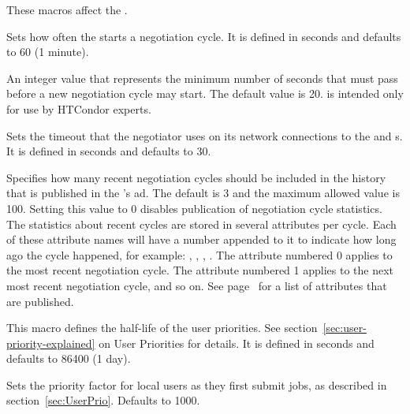 These macros affect the .
\begin{description}
  
\label{param:NegotiatorInterval}
\item[\Macro{NEGOTIATOR\_INTERVAL}]
  Sets how often the  starts a negotiation cycle.
  It is defined in seconds and defaults to 60 (1 minute).
  
\label{param:NegotiatorCycleDelay}
\item[\Macro{NEGOTIATOR\_CYCLE\_DELAY}]
  An integer value that represents the minimum number of seconds
  that must pass before a new negotiation cycle may start.
  The default value is 20.
   is intended only for use by
  HTCondor experts.

\label{param:NegotiatorTimeout}
\item[\Macro{NEGOTIATOR\_TIMEOUT}]
  Sets the timeout that the negotiator uses on its network connections
  to the  and s.
  It is defined in seconds and defaults to 30.

\label{param:NegotiationCycleStatsLength}
\item[\Macro{NEGOTIATION\_CYCLE\_STATS\_LENGTH}] Specifies how many
  recent negotiation cycles should be included in the history that is
  published in the 's ad.  The default is 3 and the
  maximum allowed value is 100.  Setting this value to 0 disables
  publication of negotiation cycle statistics.  The
  statistics about recent cycles are stored in several attributes per
  cycle.  Each of these attribute names will have a number appended to
  it to indicate how long ago the cycle happened, for example:
  ,
  ,
  , \Dots.  The attribute
  numbered 0 applies to the most recent negotiation cycle.  The
  attribute numbered 1 applies to the next most recent negotiation
  cycle, and so on.  See
  page~\pageref{attr:LastNegotiationCycleActiveSubmitterCount<X>} for a
  list of attributes that are published.

\label{param:PriorityHalfLife}
\item[\Macro{PRIORITY\_HALFLIFE}]
  This macro defines the half-life of the user priorities.  See
  section~\ref{sec:user-priority-explained}
  on User Priorities for details.  It is defined in seconds and defaults
  to 86400 (1 day).

\label{param:DefaultPrioFactor} 
\item[\Macro{DEFAULT\_PRIO\_FACTOR}]
  Sets the priority factor for local users as they first submit jobs,
  as described in section~\ref{sec:UserPrio}.
  Defaults to 1000.


\end{description}
